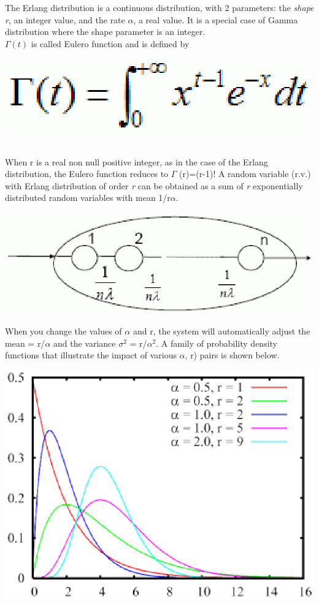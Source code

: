 The Erlang distribution is a continuous distribution, with 2 parameters: the \emph{shape r}, an integer value, and the rate \emph{$\alpha$}, a real value. It is a special case of Gamma distribution where the shape parameter is an integer.
\\
$\Gamma (t)$ is called Eulero function and is defined by \\
\begin{center}
\includegraphics[scale=.5]{img/jsim/eulergamma.eps}
\end{center}
\\
When r is a real non null positive integer, as in the  case of the Erlang distribution, the Eulero function reduces  to $\Gamma$ (r)=(r-1)!
A random variable (r.v.) with Erlang distribution  of order \emph{r} can be obtained as a sum of \emph{r} exponentially  distributed random variables with mean 1/r$\alpha$.
\begin{center}
\includegraphics[scale=.5]{img/jsim/erlang2.eps}
\end{center}
When you change the values of $\alpha$ and r, the system  will automatically adjust the mean = r/$\alpha$ and the variance $\sigma ^ 2$ = r/$\alpha ^ 2$.
A family of probability density functions that illustrate the impact of various $\alpha$, r) pairs is shown below.\\
\begin{center}
\includegraphics[scale=.5]{img/jsim/erl_pdf.eps}
\end{center}

